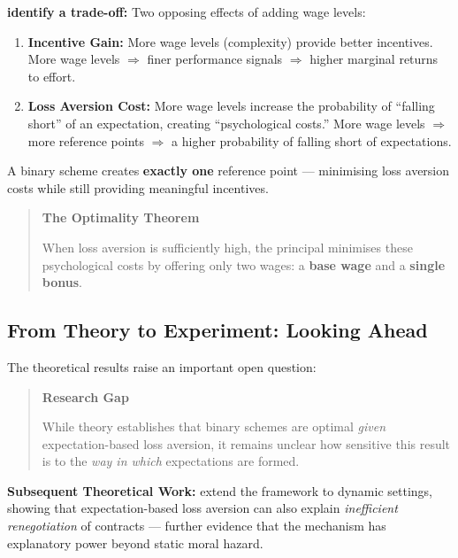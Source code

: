 \documentclass[12pt,a4paper,parskip=half]{scrartcl}
\newenvironment{block}[1]{%
  \begin{quote}
  \textbf{#1}\\[0.5em]
  \ignorespaces
}{%
  \end{quote}
}
\newenvironment{alertblock}[1]{%
  \begin{quote}
  \textcolor{alertred}{\textbf{#1}}\\[0.5em]
  \ignorespaces
}{%
  \end{quote}
}
\begin{document}
\textbf{\textcite{Herweg2010} identify a trade-off:}\newline
Two opposing effects of adding wage levels:
\begin{enumerate}
    \item \textbf{Incentive Gain:} More wage levels (complexity) provide better incentives. More wage levels $\Rightarrow$ finer performance signals $\Rightarrow$ higher marginal returns to effort.
    \item \textbf{Loss Aversion Cost:} More wage levels increase the probability of ``falling short'' of an expectation, creating ``psychological costs.'' More wage levels $\Rightarrow$ more reference points $\Rightarrow$ a higher probability of falling short of expectations.
\end{enumerate}

A binary scheme creates \textbf{exactly one} reference point --- minimising loss aversion costs while still providing meaningful incentives.

\begin{block}{The Optimality Theorem}
    When loss aversion is sufficiently high, the principal minimises these psychological costs by offering only two wages: a \textbf{base wage} and a \textbf{single bonus}.
\end{block}

\subsection*{From Theory to Experiment: Looking Ahead}

The theoretical results raise an important open question:

\bigskip

\begin{alertblock}{Research Gap}
    While theory establishes that binary schemes are optimal \emph{given} expectation-based loss aversion, it remains unclear how sensitive this result is to the \emph{way in which} expectations are formed.
\end{alertblock}

\textbf{Subsequent Theoretical Work:}\newline
\textcite{Herweg2015} extend the framework to dynamic settings, showing that expectation-based loss aversion can also explain \emph{inefficient renegotiation} of contracts --- further evidence that the mechanism has explanatory power beyond static moral hazard.

\medskip
\end{document}
